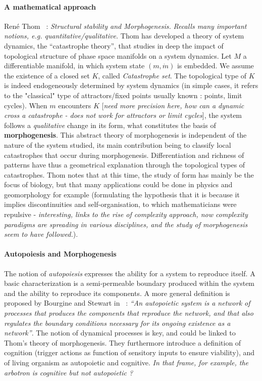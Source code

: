 \documentclass{article}
\begin{document}
\paragraph{A mathematical approach}

Ren{\'e} Thom~\cite{thom1974stabilite} : \textit{Structural stability and Morphogenesis.} \textit{Recalls many important notions, e.g. quantitative/qualitative.} Thom has developed a theory of system dynamics, the ``catastrophe theory'', that studies in deep the impact of topological structure of phase space manifolds on a system dynamics. Let $M$ a differentiable manifold, in which system state $(m,\dot{m})$ is embedded. We assume the existence of a closed set $K$, called \emph{Catastrophe set}. The topological type of $K$ is indeed endogeneously determined by system dynamics (in simple cases, it refers to the "classical" type of attractors/fixed points usually known : points, limit cycles). When $m$ encounters $K$ [\textit{need more precision here, how can a dynamic cross a catastrophe - does not work for attractors or limit cycles}], the system follows a \emph{qualitative} change in its form, what constitutes the basis of \textbf{morphogenesis}. This abstract theory of morphogenesis is independent of the nature of the system studied, its main contribution being to classify local catastrophes that occur during morphogenesis. Differentiation and richness of patterns have thus a geometrical explanation through the topological types of catastrophes. Thom notes that at this time, the study of form has mainly be the focus of biology, but that many applications could be done in physics and geomorphology for example (formulating the hypothesis that it is because it implies discontinuities and self-organisation, to which mathematicians were repulsive - \textit{interesting, links to the rise of complexity approach, now complexity paradigms are spreading in various disciplines, and the study of morphogenesis seem to have followed.}).


\paragraph{Autopoiesis and Morphogenesis}

The notion of \emph{autopoiesis} expresses the ability for a system to reproduce itself. A basic characterization is a semi-permeable boundary produced within the system and the ability to reproduce its components. A more general definition is proposed by Bourgine and Stewart in~\cite{bourgine2004autopoiesis} : \textit{``An autopoietic system is a network of processes that produces the components that reproduce the network, and that also regulates the boundary conditions necessary for its ongoing existence as a network''}. The notion of dynamical processes is key, and could be linked to Thom's theory of morphogenesis. They furthermore introduce a definition of cognition (trigger actions as function of sensitory inputs to ensure viability), and of living organism as autopoietic and cognitive. \textit{In that frame, for example, the arbotron is cognitive but not autopoietic ?}
\end{document}

